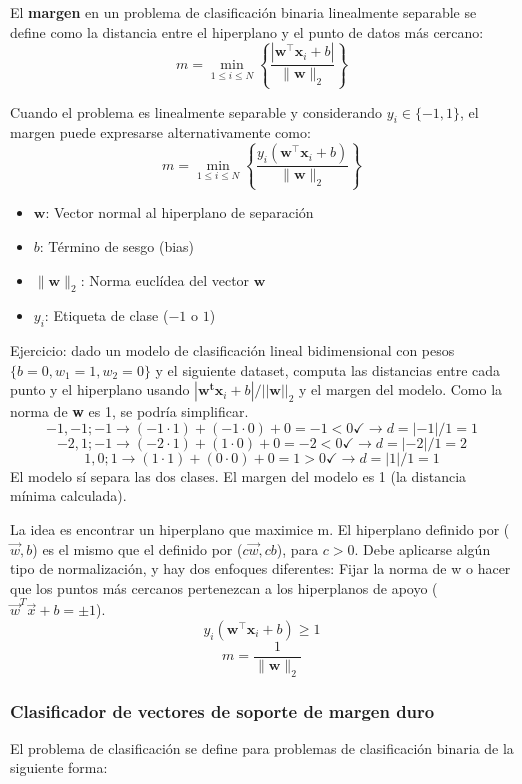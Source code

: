 El \textbf{margen} en un problema de clasificación binaria linealmente separable se define como la distancia entre el hiperplano y el punto de datos más cercano:
$$m = \min_{1 \leq i \leq N} \left\{ \frac{|\mathbf{w}^\intercal \mathbf{x}_i + b|}{\|\mathbf{w}\|_2} \right\}$$

Cuando el problema es linealmente separable y considerando $y_i \in \{-1, 1\}$, el margen puede expresarse alternativamente como:
$$m = \min_{1 \leq i \leq N} \left\{ \frac{y_i(\mathbf{w}^\intercal \mathbf{x}_i + b)}{\|\mathbf{w}\|_2} \right\}$$

\begin{itemize}
    \item $\mathbf{w}$: Vector normal al hiperplano de separación
    \item $b$: Término de sesgo (bias)
    \item $\|\mathbf{w}\|_2$: Norma euclídea del vector $\mathbf{w}$
    \item $y_i$: Etiqueta de clase ($-1$ o $1$)
\end{itemize}

Ejercicio: dado un modelo de clasificación lineal bidimensional con pesos $\{b = 0, w_1 = 1, w_2 = 0\}$ y el siguiente dataset, computa las distancias entre cada punto y el hiperplano usando $|\mathbf{w^tx}_i + b| / ||\mathbf{w}||_2$ y el margen del modelo. Como la norma de \textbf{w} es 1, se podría simplificar.
$$-1, -1; -1 \rightarrow (-1 \cdot 1) + (-1 \cdot 0) + 0 = -1 < 0 \checkmark \rightarrow d = |-1|/1 = 1 $$
$$-2, 1; -1 \rightarrow (-2 \cdot 1) + (1 \cdot 0) + 0 = -2  < 0 \checkmark \rightarrow d = |-2|/1 = 2$$
$$1, 0; 1 \rightarrow (1 \cdot 1) + (0 \cdot 0) + 0 = 1  > 0 \checkmark \rightarrow d = |1|/1 = 1$$
El modelo sí separa las dos clases. El margen del modelo es 1 (la distancia mínima calculada). 

La idea es encontrar un hiperplano que maximice m. 
El hiperplano definido por ($\vec{w}, b$) es el mismo que el definido por ($c\vec{w}, cb$), para $c > 0$. Debe aplicarse algún tipo de normalización, y hay dos enfoques diferentes: Fijar la norma de w o hacer que los puntos más cercanos pertenezcan a los hiperplanos de apoyo ($\vec{w}^T \vec{x} + b = \pm 1$).
$$y_i(\mathbf{w}^\intercal\mathbf{x}_i + b) \geq 1$$
$$m = \frac{1}{\|\mathbf{w}\|_2}$$

\subsubsection{Clasificador de vectores de soporte de margen duro}
El problema de clasificación se define para problemas de clasificación binaria de la siguiente forma: 

